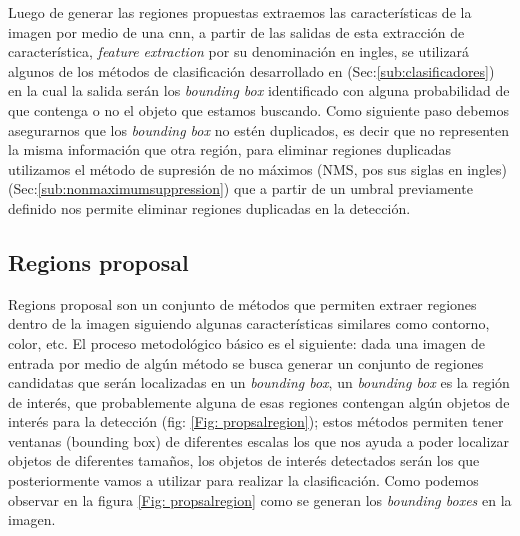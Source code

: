 Luego de generar las regiones propuestas extraemos las características de la imagen por medio de una \ac{cnn}, a partir de las salidas de esta extracción de característica, \textit{feature extraction} por su denominación en ingles, se utilizará algunos de los métodos de clasificación desarrollado en (Sec:\ref{sub:clasificadores}) en la cual la salida serán los \textit{bounding box} identificado con alguna probabilidad de que contenga o no el objeto que estamos buscando. Como siguiente paso debemos  asegurarnos que los \textit{bounding box} no estén duplicados, es decir que no representen la misma información que otra región, para eliminar regiones duplicadas utilizamos el método de supresión de no máximos (NMS, pos sus siglas en ingles) (Sec:\ref{sub:nonmaximumsuppression}) que a partir de un umbral previamente definido nos permite eliminar regiones duplicadas en la detección.



\subsection{Regions proposal} \label{sub:regions-proposal}

Regions proposal son un conjunto de métodos que permiten extraer regiones dentro de la imagen siguiendo algunas características similares como contorno, color, etc. El proceso metodológico básico es el siguiente: dada una imagen de entrada por medio de algún método se busca generar un conjunto de regiones candidatas que serán localizadas en un \textit{bounding box}, un \textit{bounding box} es la región de interés, que probablemente alguna de esas regiones contengan algún objetos de interés para la detección (fig: \ref{Fig: propsalregion}); estos métodos permiten tener ventanas (bounding box) de diferentes escalas los que nos ayuda a poder localizar objetos de diferentes tamaños, los objetos de interés detectados serán los que posteriormente vamos a utilizar para realizar la clasificación. Como podemos observar en la figura \ref{Fig: propsalregion} como se generan los \textit{bounding boxes} en la imagen.

